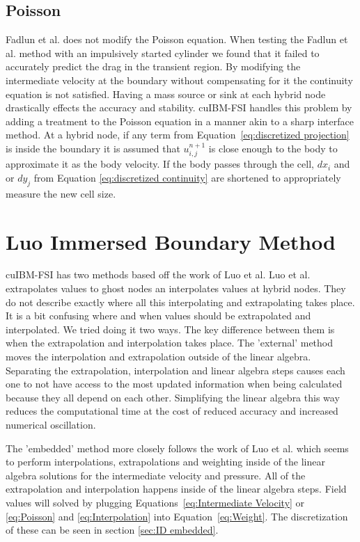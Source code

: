 \subsection{Poisson}
\label{sec:ID fadlun poisson}
Fadlun et al. does not modify the Poisson equation. 
When testing the Fadlun et al. method with an impulsively started cylinder we found that it failed to accurately predict the drag in the transient region. 
By modifying the intermediate velocity at the boundary without compensating for it the continuity equation is not satisfied. 
Having a mass source or sink at each hybrid node drastically effects the accuracy and stability. 
cuIBM-FSI handles this problem by adding a treatment to the Poisson equation in a manner akin to a sharp interface method. 
At a hybrid node, if any term from Equation~\eqref{eq:discretized projection} is inside the boundary it is assumed that $u_{i,j}^{n+1}$ is close enough to the body to approximate it as the body velocity. 
If the body passes through the cell, $dx_i$ and or $dy_j$ from Equation \eqref{eq:discretized continuity} are shortened to appropriately measure the new cell size. 

\section{Luo Immersed Boundary Method}
\label{sec:ID luo}
cuIBM-FSI has two methods based off the work of Luo et al\cite{Luo:2012gx}. 
Luo et al. extrapolates values to ghost nodes an interpolates values at hybrid nodes.
They do not describe exactly where all this interpolating and extrapolating takes place. 
It is a bit confusing where and when values should be extrapolated and interpolated.
We tried doing it two ways.
The key difference between them is when the extrapolation and interpolation takes place.
The 'external' method moves the interpolation and extrapolation outside of the linear algebra.
Separating the extrapolation, interpolation and linear algebra steps causes each one to not have access to the most updated information when being calculated because they all depend on each other.
Simplifying the linear algebra this way reduces the computational time at the cost of reduced accuracy and increased numerical oscillation. 

The 'embedded' method more closely follows the work of Luo et al. which seems to perform  interpolations, extrapolations and weighting inside of the linear algebra solutions for the intermediate velocity and pressure. 
All of the extrapolation and interpolation happens inside of the linear algebra steps.
Field values will solved by plugging Equations~\eqref{eq:Intermediate Velocity} or \eqref{eq:Poisson} and \eqref{eq:Interpolation} into Equation~\eqref{eq:Weight}. 
The discretization of these can be seen in section \ref{sec:ID embedded}. 

